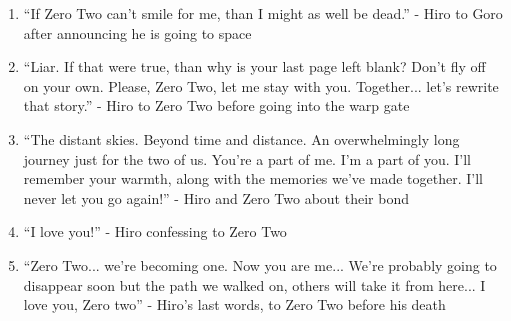 \documentclass{book}
\numberwithin{equation}{section}
\begin{document}
\begin{enumerate}
    \item ``If Zero Two can't smile for me, than I might as well be dead.'' - Hiro to Goro after announcing he is going to space 
    \item ``Liar. If that were true, than why is your last page left blank? Don't fly off on your own. Please, Zero Two, let me stay with you. Together... let's rewrite that story.'' - Hiro to Zero Two before going into the warp gate
    \item ``The distant skies. Beyond time and distance. An overwhelmingly long journey just for the two of us. You're a part of me. I'm a part of you. I'll remember your warmth, along with the memories we've made together. I'll never let you go again!'' - Hiro and Zero Two about their bond
    \item ``I love you!'' - Hiro confessing to Zero Two
    \item ``Zero Two... we're becoming one. Now you are me... We're probably going to disappear soon but the path we walked on, others will take it from here... I love you, Zero two'' - Hiro's last words, to Zero Two before his death
\end{enumerate}
\end{document}
